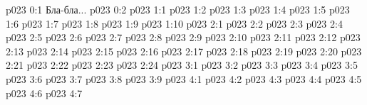 \author{Божественный Советник}
\vs p023 0:1  Бла-бла...
\vs p023 0:2 
\vs p023 1:1 
\vs p023 1:2 
\vs p023 1:3 
\vs p023 1:4 
\vs p023 1:5 
\vs p023 1:6 \pc 
\vs p023 1:7 
\vs p023 1:8 
\vs p023 1:9 \pc 
\vs p023 1:10 \pc 
{}
\vs p023 2:1 
\vs p023 2:2 \pc 
\vs p023 2:3 
\vs p023 2:4 
\vs p023 2:5 
\vs p023 2:6 
\vs p023 2:7 
\vs p023 2:8 
\vs p023 2:9 
\vs p023 2:10 \pc 
\vs p023 2:11 
\vs p023 2:12 
\vs p023 2:13 
\vs p023 2:14 
\vs p023 2:15 
\vs p023 2:16 
\vs p023 2:17 
\vs p023 2:18 
\vs p023 2:19 
\vs p023 2:20 
\vs p023 2:21 
\vs p023 2:22 
\vs p023 2:23 
\vs p023 2:24 
\vs p023 3:1 
\vs p023 3:2 \pc 
\vs p023 3:3 
\vs p023 3:4 
\vs p023 3:5 \pc 
\vs p023 3:6 
\vs p023 3:7 \pc 
\vs p023 3:8 
\vs p023 3:9 
\vs p023 4:1 
\vs p023 4:2 
\vs p023 4:3 \pc 
\vs p023 4:4 
\vs p023 4:5 \pc 
\vs p023 4:6 
\vsetoff
\vs p023 4:7 
\quizlink
